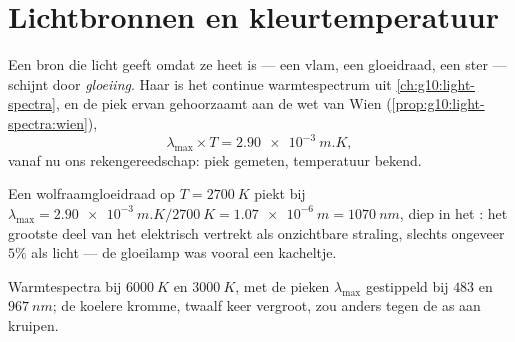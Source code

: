 \section{Lichtbronnen en kleurtemperatuur}

\begin{definition}\label{def:g11:color-light-sources:incandescent}
Een bron die licht geeft omdat ze heet is --- een vlam, een gloeidraad,
een ster --- schijnt door \emph{gloeiing}. Haar 
is het continue warmtespectrum uit \cref{ch:g10:light-spectra}, en de
piek ervan gehoorzaamt aan de wet van Wien
(\cref{prop:g10:light-spectra:wien}),
\[
\lambda_{\max} \times T = \qty{2.90e-3}{m.K},
\]
vanaf nu ons rekengereedschap: piek gemeten, temperatuur bekend.
\end{definition}

\begin{example}\label{ex:g11:color-light-sources:bulb}
Een wolfraamgloeidraad op $T = \qty{2700}{K}$ piekt bij
$\lambda_{\max} = \qty{2.90e-3}{m.K}/\qty{2700}{K} = \qty{1.07e-6}{m}
= \qty{1070}{nm}$, diep in het : het grootste deel van het
elektrisch  vertrekt als onzichtbare straling, slechts ongeveer
$5\%$ als licht --- de gloeilamp was vooral een kacheltje.
\end{example}

\begin{omfigure}

{\small Warmtespectra bij $\qty{6000}{K}$ en $\qty{3000}{K}$, met de
pieken $\lambda_{\max}$ gestippeld bij $483$ en $\qty{967}{nm}$; de
koelere kromme, twaalf keer vergroot, zou anders tegen de as aan
kruipen.}
\end{omfigure}

